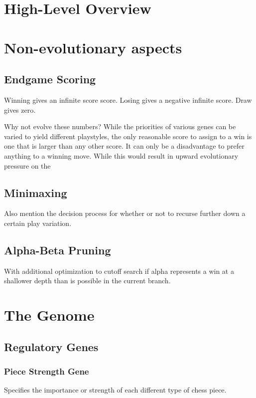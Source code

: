 \documentclass[letter]{article}
\renewcommand\_{\textunderscore\allowbreak}
\begin{document}
\section{High-Level Overview}




\section{Non-evolutionary aspects}

\subsection{Endgame Scoring}

Winning gives an infinite score score.
Losing gives a negative infinite score.
Draw gives zero.

Why not evolve these numbers? While the priorities of various genes can be varied to yield different playstyles, the only reasonable score to assign to a win is one that is larger than any other score. It can only be a disadvantage to prefer anything to a winning move. While this would result in upward evolutionary pressure on the 

\subsection{Minimaxing}

Also mention the decision process for whether or not to recurse further down a certain play variation.

\subsection{Alpha-Beta Pruning}

With additional optimization to cutoff search if alpha represents a win at a shallower depth than is possible in the current branch.




\section{The Genome}

\subsection{Regulatory Genes}
\subsubsection{Piece Strength Gene}
Specifies the importance or strength of each different type of chess piece.
\end{document}
